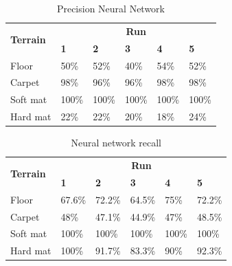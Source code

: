 \documentclass[USenglish]{ifimaster}  %
\begin{document}
\begin{table}[h]
	\centering
	\begin{tabular}{@{}llllll@{}}
		\toprule
		\multirow{2}{*}{\textbf{Terrain}} & \multicolumn{5}{c}{\textbf{Run}} \\ \cmidrule(l){2-6} 
		& \multicolumn{1}{l|}{\textbf{1}} & \multicolumn{1}{l|}{\textbf{2}} & \multicolumn{1}{l|}{\textbf{3}} & \multicolumn{1}{l|}{\textbf{4}} & \textbf{5} \\ \midrule
		\multicolumn{1}{l|}{Floor} & \multicolumn{1}{l|}{50\%} & \multicolumn{1}{l|}{52\%} & \multicolumn{1}{l|}{40\%} & \multicolumn{1}{l|}{54\%} & 52\% \\ \midrule
		\multicolumn{1}{l|}{Carpet} & \multicolumn{1}{l|}{98\%} & \multicolumn{1}{l|}{96\%} & \multicolumn{1}{l|}{96\%} & \multicolumn{1}{l|}{98\%} & 98\% \\ \midrule
		\multicolumn{1}{l|}{Soft mat} & \multicolumn{1}{l|}{100\%} & \multicolumn{1}{l|}{100\%} & \multicolumn{1}{l|}{100\%} & \multicolumn{1}{l|}{100\%} & 100\% \\ \midrule
		\multicolumn{1}{l|}{Hard mat} & \multicolumn{1}{l|}{22\%} & \multicolumn{1}{l|}{22\%} & \multicolumn{1}{l|}{20\%} & \multicolumn{1}{l|}{18\%} & 24\% \\ \bottomrule
	\end{tabular}
	\caption{Precision Neural Network}
	\label{nnPrecision}
\end{table}
\FloatBarrier

\begin{table}[h]
	\centering
	\begin{tabular}{@{}llllll@{}}
		\toprule
		\multirow{2}{*}{\textbf{Terrain}} & \multicolumn{5}{c}{\textbf{Run}} \\ \cmidrule(l){2-6} 
		& \multicolumn{1}{l|}{\textbf{1}} & \multicolumn{1}{l|}{\textbf{2}} & \multicolumn{1}{l|}{\textbf{3}} & \multicolumn{1}{l|}{\textbf{4}} & \textbf{5} \\ \midrule
		\multicolumn{1}{l|}{Floor} & \multicolumn{1}{l|}{67.6\%} & \multicolumn{1}{l|}{72.2\%} & \multicolumn{1}{l|}{64.5\%} & \multicolumn{1}{l|}{75\%} & 72.2\% \\ \midrule
		\multicolumn{1}{l|}{Carpet} & \multicolumn{1}{l|}{48\%} & \multicolumn{1}{l|}{47.1\%} & \multicolumn{1}{l|}{44.9\%} & \multicolumn{1}{l|}{47\%} & 48.5\% \\ \midrule
		\multicolumn{1}{l|}{Soft mat} & \multicolumn{1}{l|}{100\%} & \multicolumn{1}{l|}{100\%} & \multicolumn{1}{l|}{100\%} & \multicolumn{1}{l|}{100\%} & 100\% \\ \midrule
		\multicolumn{1}{l|}{Hard mat} & \multicolumn{1}{l|}{100\%} & \multicolumn{1}{l|}{91.7\%} & \multicolumn{1}{l|}{83.3\%} & \multicolumn{1}{l|}{90\%} & 92.3\% \\ \bottomrule
	\end{tabular}
	\caption{Neural network recall}
	\label{nnrecall}
\end{table}
\FloatBarrier
\end{document}
